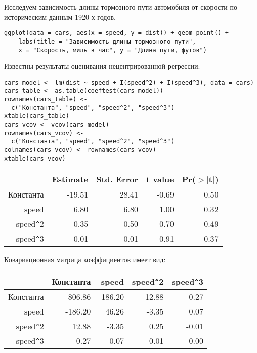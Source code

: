 \begin{problem}
Исследуем зависимость длины тормозного пути автомобиля от скорости по историческим данным 1920-х годов.

\begin{verbatim}
ggplot(data = cars, aes(x = speed, y = dist)) + geom_point() +
    labs(title = "Зависимость длины тормозного пути",
    x = "Скорость, миль в час", y = "Длина пути, футов")
\end{verbatim}


\begin{minipage}{0.6\textwidth}
\begin{center}

\end{center}
\end{minipage}



Известны результаты оценивания нецентрированной регрессии:

\begin{verbatim}
cars_model <- lm(dist ~ speed + I(speed^2) + I(speed^3), data = cars)
cars_table <- as.table(coeftest(cars_model))
rownames(cars_table) <-
  c("Константа", "speed", "speed^2", "speed^3")
xtable(cars_table)
cars_vcov <- vcov(cars_model)
rownames(cars_vcov) <-
  c("Константа", "speed", "speed^2", "speed^3")
colnames(cars_vcov) <- rownames(cars_vcov)
xtable(cars_vcov)
\end{verbatim}



\begin{tabular}{rrrrr}
  \hline
 & Estimate & Std. Error & t value & Pr($>$$|$t$|$) \\ 
  \hline
Константа & -19.51 & 28.41 & -0.69 & 0.50 \\ 
  speed & 6.80 & 6.80 & 1.00 & 0.32 \\ 
  speed\verb|^|2 & -0.35 & 0.50 & -0.70 & 0.49 \\ 
  speed\verb|^|3 & 0.01 & 0.01 & 0.91 & 0.37 \\ 
   \hline
\end{tabular}


Ковариационная матрица коэффициентов имеет вид:

\begin{tabular}{rrrrr}
  \hline
 & Константа & speed & speed\verb|^|2 & speed\verb|^|3 \\ 
  \hline
Константа & 806.86 & -186.20 & 12.88 & -0.27 \\ 
  speed & -186.20 & 46.26 & -3.35 & 0.07 \\ 
  speed\verb|^|2 & 12.88 & -3.35 & 0.25 & -0.01 \\ 
  speed\verb|^|3 & -0.27 & 0.07 & -0.01 & 0.00 \\ 
   \hline
\end{tabular}



\end{problem}

